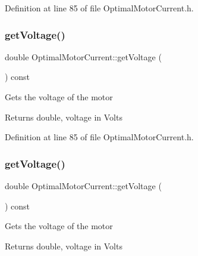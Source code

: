 Definition at line 85 of file Optimal\+Motor\+Current.\+h.

\mbox{\label{class_optimal_motor_current_a4f9b5f8b83287868a72bfeca97713fd3}} 
\subsubsection{\texorpdfstring{get\+Voltage()}{getVoltage()}\hspace{0.1cm}{\footnotesize\ttfamily [2/3]}}
{\footnotesize\ttfamily double Optimal\+Motor\+Current\+::get\+Voltage (\begin{DoxyParamCaption}{ }\end{DoxyParamCaption}) const\hspace{0.3cm}{\ttfamily [inline]}}

Gets the voltage of the motor

\begin{DoxyReturn}{Returns}
double, voltage in Volts 
\end{DoxyReturn}


Definition at line 85 of file Optimal\+Motor\+Current.\+h.

\mbox{\label{class_optimal_motor_current_a4f9b5f8b83287868a72bfeca97713fd3}} 
\subsubsection{\texorpdfstring{get\+Voltage()}{getVoltage()}\hspace{0.1cm}{\footnotesize\ttfamily [3/3]}}
{\footnotesize\ttfamily double Optimal\+Motor\+Current\+::get\+Voltage (\begin{DoxyParamCaption}{ }\end{DoxyParamCaption}) const\hspace{0.3cm}{\ttfamily [inline]}}

Gets the voltage of the motor

\begin{DoxyReturn}{Returns}
double, voltage in Volts 
\end{DoxyReturn}


